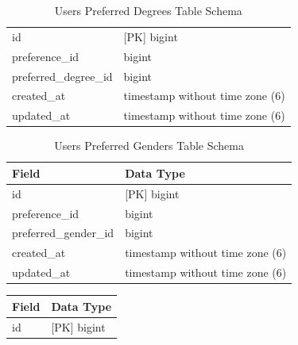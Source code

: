 \begin{enumerate}
\begin{table}[h!]
\begin{tabular}{ll}
    id                           & [PK] bigint                        \\ 
    preference\_id               & bigint                             \\ 
    preferred\_degree\_id        & bigint                             \\ 
    created\_at                  & timestamp without time zone (6)    \\ 
    updated\_at                  & timestamp without time zone (6)    \\ \hline
    \end{tabular}
    \caption{Users Preferred Degrees Table Schema}
    \label{tab:Users Preferred Degrees Table Schema}
    \end{table}
    \vspace{2cm} %
    \begin{table}[h!]
    \captionsetup{justification=centering, singlelinecheck=false, labelsep=space}
    \centering
    \begin{tabular}{ll}
    \hline
    \textbf{Field}               & \textbf{Data Type}                 \\ \hline
    id                           & [PK] bigint                        \\ 
    preference\_id               & bigint                             \\ 
    preferred\_gender\_id        & bigint                             \\ 
    created\_at                  & timestamp without time zone (6)    \\ 
    updated\_at                  & timestamp without time zone (6)    \\ \hline
    \end{tabular}
    \caption{Users Preferred Genders Table Schema}
    \label{tab:Users Preferred Genders Table Schema}
    \end{table}
    \vspace{2cm} %
    \begin{table}[h!]
    \captionsetup{justification=centering, singlelinecheck=false, labelsep=space}
    \centering
    \begin{tabular}{ll}
    \hline
    \textbf{Field}               & \textbf{Data Type}                 \\ \hline
    id                           & [PK] bigint                        \\ 

\end{tabular}
\end{table}
\end{enumerate}
